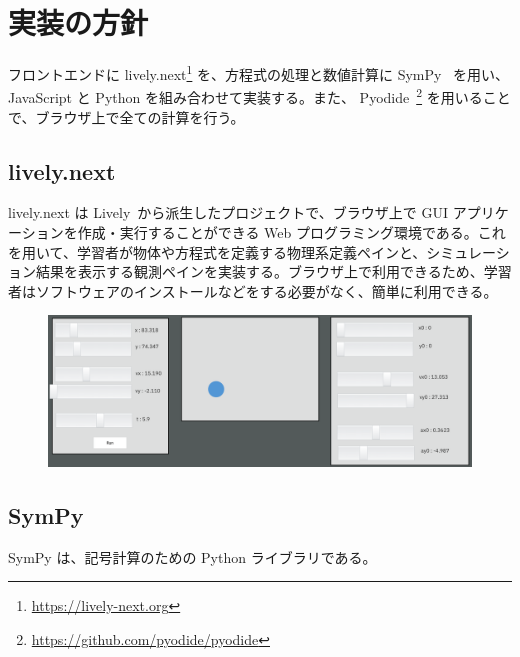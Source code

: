 \chapter{実装の方針} \label{implementation}

フロントエンドに lively.next\footnote{\url{https://lively-next.org}} を、方程式の処理と数値計算に SymPy~\cite{meurer_sympy_2017} を用い、JavaScript と Python を組み合わせて実装する。また、 Pyodide~\footnote{\tiny{\url{https://github.com/pyodide/pyodide}}} を用いることで、ブラウザ上で全ての計算を行う。

\section{lively.next}
lively.next は Lively~\cite{ingalls_2008}から派生したプロジェクトで、ブラウザ上で GUI アプリケーションを作成・実行することができる Web プログラミング環境である。これを用いて、学習者が物体や方程式を定義する物理系定義ペインと、シミュレーション結果を表示する観測ペインを実装する。ブラウザ上で利用できるため、学習者はソフトウェアのインストールなどをする必要がなく、簡単に利用できる。

\begin{figure}[hbt]
\includegraphics[width=0.9\linewidth]{figure/lively_example.png}
\end{figure}

\section{SymPy}
SymPy は、記号計算のための Python ライブラリである。

